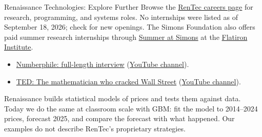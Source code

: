 \documentclass[aspectratio=169,11pt]{beamer}
\begin{document}
\begin{frame}{Renaissance Technologies: Explore Further}
 Browse the
\href{https://www.rentec.com/Careers.action?jobs=true}{RenTec careers page}
for research, programming, and systems roles. No internships were listed
as of September 18, 2026; check for new openings. The Simons Foundation also
offers paid summer research internships through
\href{https://www.simonsfoundation.org/summer-at-simons/}{Summer at Simons}
at the \href{https://www.simonsfoundation.org/flatiron/}{Flatiron Institute}.

\vspace{0.6em}
\begin{itemize}\setlength{\itemsep}{0.6em}
\item \href{https://varnerlab.org/watch.html?v=QNznD9hMEh0}{Numberphile: full-length interview}
  \quad (\href{https://www.youtube.com/@numberphile2}{YouTube channel}).
\item \href{https://www.ted.com/talks/jim_simons_the_mathematician_who_cracked_wall_street}{TED: The mathematician who cracked Wall Street}
  \quad (\href{https://www.youtube.com/@TED}{YouTube channel}).
\end{itemize}

\vspace{0.5em}
 Renaissance builds statistical models of prices
and tests them against data. Today we do the same at classroom scale with GBM:
fit the model to 2014--2024 prices, forecast 2025, and compare the forecast
with what happened. Our examples do not describe RenTec's proprietary strategies.
\end{frame}
\end{document}
